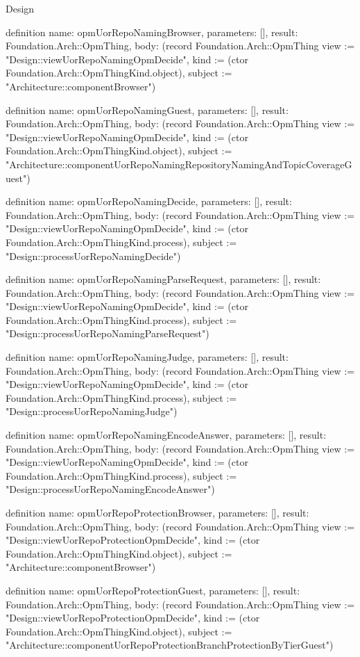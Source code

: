 \begin{lexlean}{Design}
\begin{semanticmodule}
definition{
  name: opmUorRepoNamingBrowser,
  parameters: [],
  result: Foundation.Arch::OpmThing,
  body: (record Foundation.Arch::OpmThing {view := "Design::viewUorRepoNamingOpmDecide", kind := (ctor Foundation.Arch::OpmThingKind.object), subject := "Architecture::componentBrowser"})
}

definition{
  name: opmUorRepoNamingGuest,
  parameters: [],
  result: Foundation.Arch::OpmThing,
  body: (record Foundation.Arch::OpmThing {view := "Design::viewUorRepoNamingOpmDecide", kind := (ctor Foundation.Arch::OpmThingKind.object), subject := "Architecture::componentUorRepoNamingRepositoryNamingAndTopicCoverageGuest"})
}

definition{
  name: opmUorRepoNamingDecide,
  parameters: [],
  result: Foundation.Arch::OpmThing,
  body: (record Foundation.Arch::OpmThing {view := "Design::viewUorRepoNamingOpmDecide", kind := (ctor Foundation.Arch::OpmThingKind.process), subject := "Design::processUorRepoNamingDecide"})
}

definition{
  name: opmUorRepoNamingParseRequest,
  parameters: [],
  result: Foundation.Arch::OpmThing,
  body: (record Foundation.Arch::OpmThing {view := "Design::viewUorRepoNamingOpmDecide", kind := (ctor Foundation.Arch::OpmThingKind.process), subject := "Design::processUorRepoNamingParseRequest"})
}

definition{
  name: opmUorRepoNamingJudge,
  parameters: [],
  result: Foundation.Arch::OpmThing,
  body: (record Foundation.Arch::OpmThing {view := "Design::viewUorRepoNamingOpmDecide", kind := (ctor Foundation.Arch::OpmThingKind.process), subject := "Design::processUorRepoNamingJudge"})
}

definition{
  name: opmUorRepoNamingEncodeAnswer,
  parameters: [],
  result: Foundation.Arch::OpmThing,
  body: (record Foundation.Arch::OpmThing {view := "Design::viewUorRepoNamingOpmDecide", kind := (ctor Foundation.Arch::OpmThingKind.process), subject := "Design::processUorRepoNamingEncodeAnswer"})
}

definition{
  name: opmUorRepoProtectionBrowser,
  parameters: [],
  result: Foundation.Arch::OpmThing,
  body: (record Foundation.Arch::OpmThing {view := "Design::viewUorRepoProtectionOpmDecide", kind := (ctor Foundation.Arch::OpmThingKind.object), subject := "Architecture::componentBrowser"})
}

definition{
  name: opmUorRepoProtectionGuest,
  parameters: [],
  result: Foundation.Arch::OpmThing,
  body: (record Foundation.Arch::OpmThing {view := "Design::viewUorRepoProtectionOpmDecide", kind := (ctor Foundation.Arch::OpmThingKind.object), subject := "Architecture::componentUorRepoProtectionBranchProtectionByTierGuest"})
}


\end{semanticmodule}
\end{lexlean}
